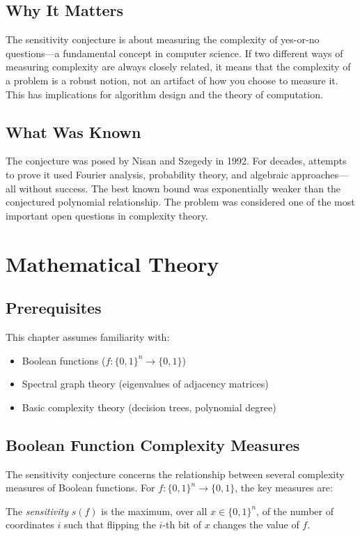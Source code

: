 \subsection{Why It Matters}
The sensitivity conjecture is about measuring the complexity of yes-or-no questions---a fundamental concept in computer science. If two different ways of measuring complexity are always closely related, it means that the complexity of a problem is a robust notion, not an artifact of how you choose to measure it. This has implications for algorithm design and the theory of computation.

\subsection{What Was Known}
The conjecture was posed by Nisan and Szegedy in 1992. For decades, attempts to prove it used Fourier analysis, probability theory, and algebraic approaches---all without success. The best known bound was exponentially weaker than the conjectured polynomial relationship. The problem was considered one of the most important open questions in complexity theory.

\section{Mathematical Theory}

\subsection{Prerequisites}
This chapter assumes familiarity with:
\begin{itemize}
\item Boolean functions ($f: \{0,1\}^n \to \{0,1\}$)
\item Spectral graph theory (eigenvalues of adjacency matrices)
\item Basic complexity theory (decision trees, polynomial degree)
\end{itemize}

\subsection{Boolean Function Complexity Measures}

The sensitivity conjecture concerns the relationship between several complexity measures of Boolean functions. For $f: \{0,1\}^n \to \{0,1\}$, the key measures are:

\begin{definition}[Sensitivity]
The \emph{sensitivity} $s(f)$ is the maximum, over all $x \in \{0,1\}^n$, of the number of coordinates $i$ such that flipping the $i$-th bit of $x$ changes the value of $f$.
\end{definition}

